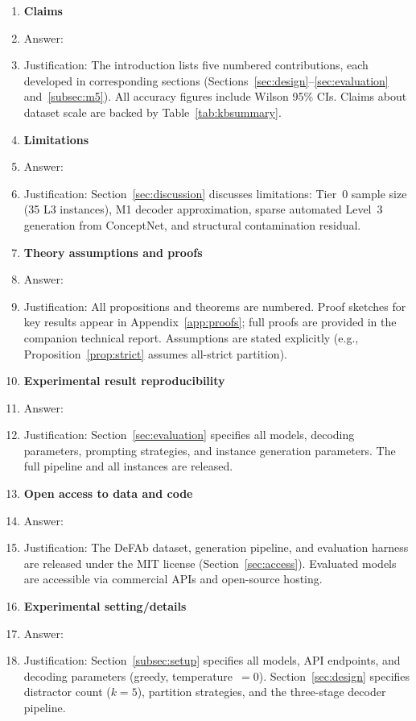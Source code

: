 \documentclass{article}
\theoremstyle{definition}
\begin{document}
\begin{enumerate}

\item {\bf Claims}
    \item[] Answer: \answerYes{}
    \item[] Justification: The introduction lists five numbered contributions, each developed in corresponding sections (Sections~\ref{sec:design}--\ref{sec:evaluation} and~\ref{subsec:m5}). All accuracy figures include Wilson 95\% CIs. Claims about dataset scale are backed by Table~\ref{tab:kbsummary}.

\item {\bf Limitations}
    \item[] Answer: \answerYes{}
    \item[] Justification: Section~\ref{sec:discussion} discusses limitations: Tier~0 sample size (35 L3 instances), M1 decoder approximation, sparse automated Level~3 generation from ConceptNet, and structural contamination residual.

\item {\bf Theory assumptions and proofs}
    \item[] Answer: \answerYes{}
    \item[] Justification: All propositions and theorems are numbered. Proof sketches for key results appear in Appendix~\ref{app:proofs}; full proofs are provided in the companion technical report. Assumptions are stated explicitly (e.g., Proposition~\ref{prop:strict} assumes all-strict partition).

\item {\bf Experimental result reproducibility}
    \item[] Answer: \answerYes{}
    \item[] Justification: Section~\ref{sec:evaluation} specifies all models, decoding parameters, prompting strategies, and instance generation parameters. The full pipeline and all instances are released.

\item {\bf Open access to data and code}
    \item[] Answer: \answerYes{}
    \item[] Justification: The DeFAb dataset, generation pipeline, and evaluation harness are released under the MIT license (Section~\ref{sec:access}). Evaluated models are accessible via commercial APIs and open-source hosting.

\item {\bf Experimental setting/details}
    \item[] Answer: \answerYes{}
    \item[] Justification: Section~\ref{subsec:setup} specifies all models, API endpoints, and decoding parameters (greedy, temperature~$= 0$). Section~\ref{sec:design} specifies distractor count ($k = 5$), partition strategies, and the three-stage decoder pipeline.


\end{enumerate}
\end{document}
